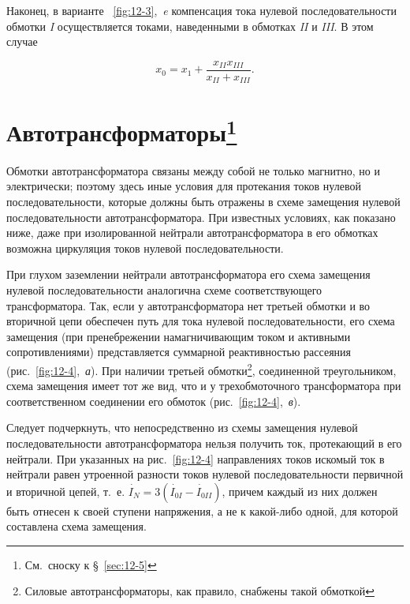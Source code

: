 Наконец, в варианте ~\ref{fig:12-3},~\textit{e} компенсация тока нулевой последовательности обмотки \textit{I} осуществляется токами, наведенными в обмотках \textit{II} и \textit{III}. В этом случае

\begin{equation*}
	x_0 = x_1 + \frac{ x_{II} x_{III} }{ x_{II} + x_{III} } \text{.}
\end{equation*}

\section{Автотрансформаторы\protect\footnote{См.~сноску к §~\ref{sec:12-5}}}
\label{sec:12-6}

Обмотки автотрансформатора связаны между собой не только магнитно, но и электрически; поэтому здесь иные условия для протекания токов нулевой последовательности, которые должны быть отражены в схеме замещения нулевой последовательности автотрансформатора. При известных условиях, как показано ниже, даже при изолированной нейтрали автотрансформатора в его обмотках возможна циркуляция токов нулевой последовательности.

При глухом заземлении нейтрали автотрансформатора его схема замещения нулевой последовательности аналогична схеме соответствующего трансформатора. Так, если у автотрансформатора нет третьей обмотки и во вторичной цепи обеспечен путь для тока нулевой последовательности, его схема замещения (при пренебрежении намагничивающим током и активными сопротивлениями) представляется суммарной реактивностью рассеяния (рис.~\ref{fig:12-4},~\textit{а}). При наличии третьей обмотки\footnote{Силовые автотрансформаторы, как правило, снабжены такой обмоткой}, соединенной треугольником, схема замещения имеет тот же вид, что и у трехобмоточного трансформатора при соответственном соединении его обмоток (рис.~\ref{fig:12-4},~\textit{в}).

Следует подчеркнуть, что непосредственно из схемы замещения нулевой последовательности автотрансформатора нельзя получить ток, протекающий в его нейтрали. При указанных на рис.~\ref{fig:12-4} направлениях токов искомый ток в нейтрали равен утроенной разности токов нулевой последовательности первичной и вторичной цепей, т.~е. $ \overset{~\cdot}{I}_N = 3( \overset{~\cdot}{I}_{0I} - \overset{~\cdot}{I}_{0II}) $, причем каждый из них должен быть отнесен к своей ступени напряжения, а не к какой-либо одной, для которой составлена схема замещения.


